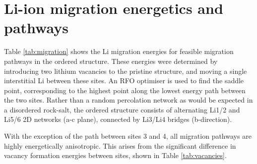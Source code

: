 \newpage


\begin{table}[t] %
\centering
\caption{Li vacancy migration energies and path lengths in ordered .}
\label{tab:migration}
\end{table}

\section{Li-ion migration energetics and pathways}
\label{sec:migration}
Table \ref{tab:migration} shows the Li migration energies for feasible migration pathways in the ordered  structure.
These energies were determined by introducing two lithium vacancies to the pristine structure, and moving a single interstitial Li between these sites.
An RFO optimiser is used to find the saddle point, corresponding to the highest point along the lowest energy path between the two sites.
Rather than a random percolation network as would be expected in a disordered rock-salt, the ordered structure consists of alternating Li1/2 and Li5/6 2D networks (a-c plane), connected by Li3/Li4 bridges (b-direction). 


With the exception of the path between sites 3 and 4, all migration pathways are highly energetically anisotropic.
This arises from the significant difference in vacancy formation energies between sites, shown in Table \ref{tab:vacancies}.

